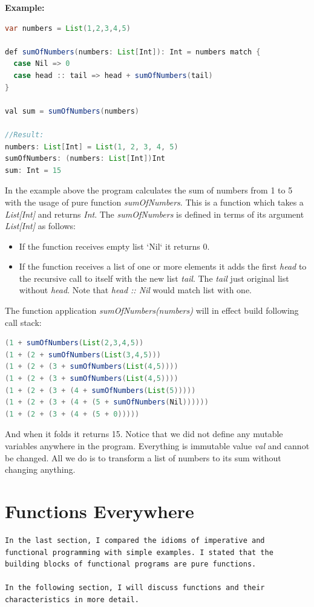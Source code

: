 \documentclass[12pt,twoside,a4paper]{report}
\begin{document}
\textbf{Example:}
\begin{lstlisting}[language=java]
var numbers = List(1,2,3,4,5)
  
def sumOfNumbers(numbers: List[Int]): Int = numbers match {
  case Nil => 0
  case head :: tail => head + sumOfNumbers(tail)
}
  
val sum = sumOfNumbers(numbers)

//Result:
numbers: List[Int] = List(1, 2, 3, 4, 5)
sumOfNumbers: (numbers: List[Int])Int
sum: Int = 15
\end{lstlisting}

In the example above the program calculates the sum of numbers from 1 to 5 with the usage of pure function \emph{sumOfNumbers}. This is a function which takes a \emph{List[Int]} and returns \emph{Int}. The \emph{sumOfNumbers} is defined in terms of its argument \emph{List[Int]} as follows:

\begin{itemize}\itemsep1pt \parskip0pt 
\item If the function receives empty list `Nil` it returns 0.
\item If the function receives a list of one or more elements it adds the first  \emph{head} to the recursive call to itself with the new list \emph{tail}.  The \emph{tail} just original list without \emph{head}. Note that \emph{head :: Nil} would match list with one.
\end{itemize}

The function application \emph{sumOfNumbers(numbers)} will in effect build following call stack:

\begin{lstlisting}[language=java]
(1 + sumOfNumbers(List(2,3,4,5))
(1 + (2 + sumOfNumbers(List(3,4,5)))
(1 + (2 + (3 + sumOfNumbers(List(4,5))))
(1 + (2 + (3 + sumOfNumbers(List(4,5))))
(1 + (2 + (3 + (4 + sumOfNumbers(List(5)))))
(1 + (2 + (3 + (4 + (5 + sumOfNumbers(Nil))))))
(1 + (2 + (3 + (4 + (5 + 0)))))
\end{lstlisting}

And when it folds it returns 15. Notice that we did not define any mutable variables anywhere in the program. Everything is immutable value \emph{val} and cannot be changed. All we do is to transform a list of numbers to its sum without changing anything.



\section{Functions Everywhere}\label{6.4}
\begin{lstlisting}
In the last section, I compared the idioms of imperative and functional programming with simple examples. I stated that the building blocks of functional programs are pure functions.

In the following section, I will discuss functions and their characteristics in more detail.
\end{lstlisting}
\end{document}
